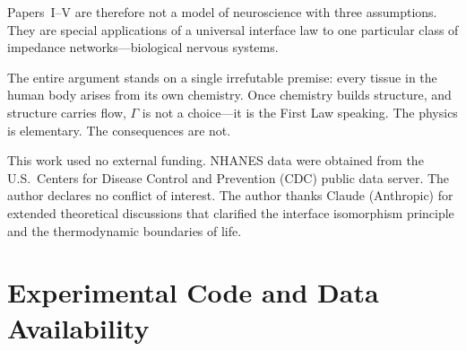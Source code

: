 \documentclass[aps,pre,twocolumn,superscriptaddress,floatfix]{revtex4-2}
\begin{document}
Papers~I--V are therefore not a model of neuroscience
with three assumptions.
They are special applications of a universal interface law
to one particular class of impedance networks---biological
nervous systems.

The entire argument stands on a single irrefutable
premise: every tissue in the human body arises from
its own chemistry.
Once chemistry builds structure, and structure carries flow,
$\Gamma$ is not a choice---it is the First Law speaking.
The physics is elementary.
The consequences are not.


\begin{acknowledgments}
This work used no external funding.
NHANES data were obtained from the U.S.\ Centers for Disease
Control and Prevention (CDC) public data server.
The author declares no conflict of interest.
The author thanks Claude (Anthropic) for extended
theoretical discussions that clarified the interface
isomorphism principle and the thermodynamic boundaries of life.
\end{acknowledgments}


\appendix

\section{Experimental Code and Data Availability}
\label{app:code}
\end{document}
